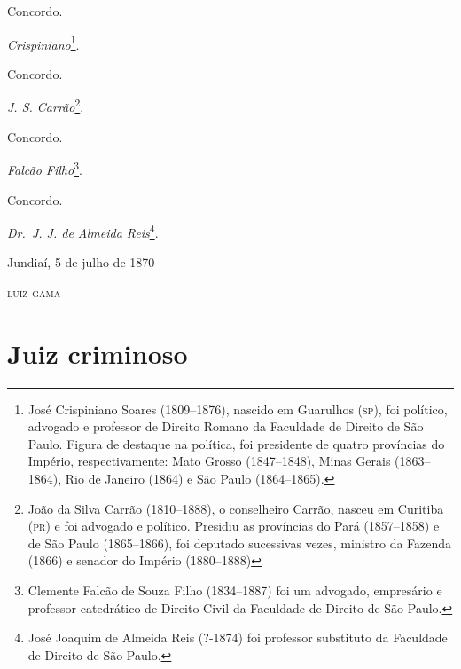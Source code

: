 Concordo.

\emph{Crispiniano}\footnote{ José Crispiniano Soares (1809--1876),
  nascido em Guarulhos (\textsc{sp}), foi político, advogado e professor de
  Direito Romano da Faculdade de Direito de São Paulo. Figura de
  destaque na política, foi presidente de quatro províncias do Império,
  respectivamente: Mato Grosso (1847--1848), Minas Gerais (1863--1864),
  Rio de Janeiro (1864) e São Paulo (1864--1865).}.

Concordo.

\emph{J. S. Carrão}\footnote{ João da Silva Carrão (1810--1888), o
  conselheiro Carrão, nasceu em Curitiba (\textsc{pr}) e foi advogado e político.
  Presidiu as províncias do Pará (1857--1858) e de São Paulo (1865--1866),
  foi deputado sucessivas vezes, ministro da Fazenda (1866) e senador do
  Império (1880--1888)}.

Concordo.

\emph{Falcão Filho}\footnote{ Clemente Falcão de Souza Filho
  (1834--1887) foi um advogado, empresário e professor catedrático de
  Direito Civil da Faculdade de Direito de São Paulo.}.

Concordo.

\emph{Dr.~J. J. de Almeida Reis}\footnote{ José Joaquim de Almeida Reis
  (?-1874) foi professor substituto da Faculdade de Direito de São
  Paulo.}.

\begin{flushright}
Jundiaí, 5 de julho de 1870

\textsc{luiz gama}
\end{flushright}

\part{Juiz criminoso}

